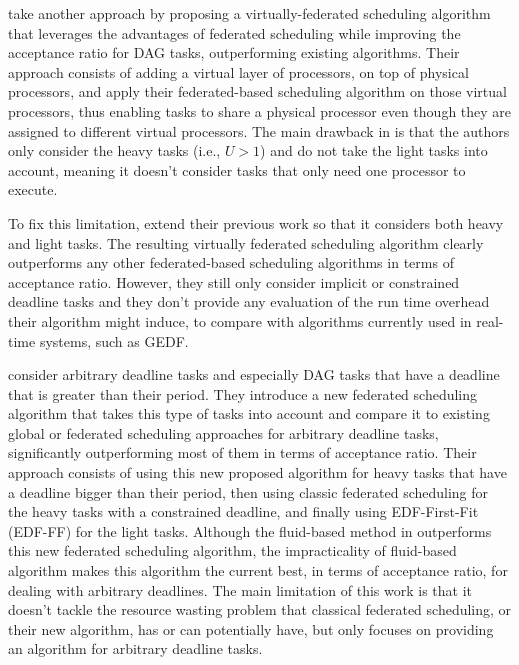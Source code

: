 \citet{JiangVirtuallyFederatedSched2021}
take another approach by proposing a virtually-federated 
scheduling algorithm that leverages the advantages
of federated scheduling while improving the acceptance 
ratio for DAG tasks, outperforming existing algorithms.
Their approach consists of adding a virtual layer
of processors, on top of physical processors,
and apply their federated-based scheduling algorithm on those virtual processors,
thus enabling tasks to share a physical processor
even though they are assigned to different virtual processors.
The main drawback in \cite{JiangVirtuallyFederatedSched2021}
is that the authors only consider the heavy tasks (i.e., $U > 1$)
and do not take the light tasks into account,
meaning it doesn't consider tasks that only need 
one processor to execute.

To fix this limitation, \citet{Jiang2023SchedVirtualProcs}
extend their previous work\cite{JiangVirtuallyFederatedSched2021}
so that it considers both heavy and light tasks.
The resulting virtually federated scheduling algorithm
clearly outperforms any other federated-based scheduling algorithms
in terms of acceptance ratio.
However, they still only consider implicit or constrained deadline tasks
and they don't provide any evaluation of the run time overhead 
their algorithm might induce, to compare with algorithms currently used
in real-time systems, such as GEDF.


\citet{Guan2023FederatedNew} 
consider arbitrary deadline tasks and especially
DAG tasks that have a deadline that is greater than their period.
They introduce a new federated scheduling algorithm 
that takes this type of tasks into account 
and compare it to existing global or federated scheduling approaches
for arbitrary deadline tasks, significantly outperforming
most of them in terms of acceptance ratio.
Their approach consists of using this new proposed algorithm 
for heavy tasks that have a deadline bigger than their period,
then using classic federated scheduling for the heavy tasks with a 
constrained deadline, and finally using EDF-First-Fit (EDF-FF) for the light tasks.
Although the fluid-based method in \cite{GuanFluidDag2022}
outperforms this new federated scheduling algorithm,
the impracticality of fluid-based algorithm makes this algorithm
the current best, in terms of acceptance ratio, for dealing with arbitrary
deadlines. The main limitation of this work 
is that it doesn't tackle the resource wasting problem 
that classical federated scheduling, or their new algorithm, has or can potentially have, but only
focuses on providing an algorithm for arbitrary deadline tasks.

